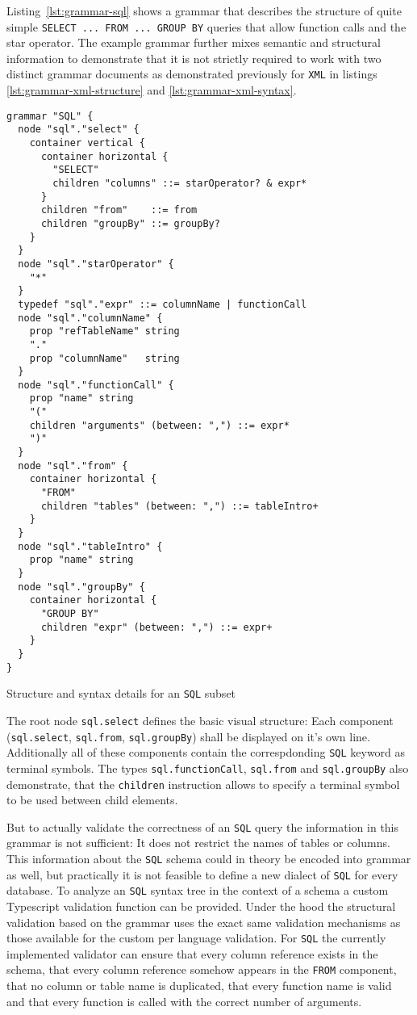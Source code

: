 \documentclass[sigconf,natbib=false]{acmart}
\newenvironment{longlisting}{\captionsetup{type=listing} \vspace{1.5em}}{\vspace{1.5em}}
\begin{document}
Listing~\ref{lst:grammar-sql} shows a grammar that describes the structure of quite simple \texttt{SELECT ... FROM ... GROUP BY} queries that allow function calls and the star operator. The example grammar further mixes semantic and structural information to demonstrate that it is not strictly required to work with two distinct grammar documents as demonstrated previously for \texttt{XML} in listings \ref{lst:grammar-xml-structure} and \ref{lst:grammar-xml-syntax}.

\begin{longlisting}
\begin{verbatim}
grammar "SQL" {
  node "sql"."select" {
    container vertical {
      container horizontal {
        "SELECT"
        children "columns" ::= starOperator? & expr*
      }
      children "from"    ::= from
      children "groupBy" ::= groupBy?
    }
  }
  node "sql"."starOperator" {
    "*"
  }
  typedef "sql"."expr" ::= columnName | functionCall
  node "sql"."columnName" {
    prop "refTableName" string
    "."
    prop "columnName"   string
  }
  node "sql"."functionCall" {
    prop "name" string
    "("
    children "arguments" (between: ",") ::= expr*
    ")"
  }
  node "sql"."from" {
    container horizontal {
      "FROM"
      children "tables" (between: ",") ::= tableIntro+
    }
  }
  node "sql"."tableIntro" {
    prop "name" string
  }
  node "sql"."groupBy" {
    container horizontal {
      "GROUP BY"
      children "expr" (between: ",") ::= expr+
    }
  }
}
\end{verbatim}
\caption{Structure and syntax details for an \texttt{SQL} subset}
\label{lst:grammar-sql}
\end{longlisting}

The root node \texttt{sql.select} defines the basic visual structure: Each component (\texttt{sql.select}, \texttt{sql.from}, \texttt{sql.groupBy}) shall be displayed on it's own line. Additionally all of these components contain the correspdonding \texttt{SQL} keyword as terminal symbols. The types \texttt{sql.functionCall}, \texttt{sql.from} and \texttt{sql.groupBy} also demonstrate, that the \texttt{children} instruction allows to specify a terminal symbol to be used between child elements.

But to actually validate the correctness of an \texttt{SQL} query the information in this grammar is not sufficient: It does not restrict the names of tables or columns. This information about the \texttt{SQL} schema could in theory be encoded into grammar as well, but practically it is not feasible to define a new dialect of \texttt{SQL} for every database. To analyze an \texttt{SQL} syntax tree in the context of a schema a custom Typescript validation function can be provided. Under the hood the structural validation based on the grammar uses the exact same validation mechanisms as those available for the custom per language validation. For \texttt{SQL} the currently implemented validator can ensure that every column reference exists in the schema, that every column reference somehow appears in the \texttt{FROM} component, that no column or table name is duplicated, that every function name is valid and that every function is called with the correct number of arguments.
\end{document}
